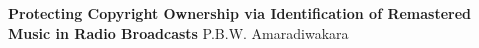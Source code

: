 \begin{titlepage}
    \begin{center}
        \textbf{\Huge{Protecting Copyright Ownership via Identification of Remastered Music in Radio Broadcasts}}
        \vfill
        \huge{P.B.W. Amaradiwakara}
    \end{center}
\end{titlepage}
